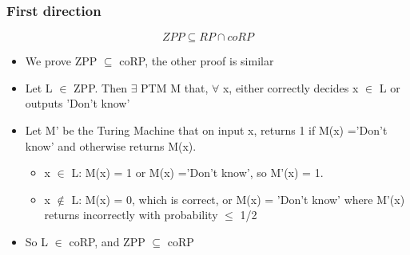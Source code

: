\documentclass{beamer}
\begin{document}

\begin{frame}
\frametitle{First direction}
$$
ZPP \subseteq RP \cap coRP
$$
\begin{itemize}
	\item We prove ZPP $\subseteq$ coRP, the other proof is similar
	\item Let L $\in$ ZPP. Then $\exists$ PTM M that, $\forall$ x, either correctly decides x $\in$ L or outputs 'Don't know'
	\item Let M' be the Turing Machine that on input x, returns 1 if M(x) ='Don't know' and otherwise returns M(x).
	\begin{itemize}
		\item x $\in$ L: M(x) = 1 or M(x) ='Don't know', so M'(x) = 1.

		\item x $\notin$ L: M(x) = 0, which is correct, or M(x) = 'Don't know' where M'(x)  returns incorrectly with probability $\leq$ 1/2
	\end{itemize}
	\item So L $\in$ coRP, and ZPP $\subseteq$ coRP
\end{itemize}
\end{frame}

\end{document}
